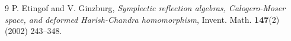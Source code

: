 \documentclass[12pt, a4paper]{amsart}
\begin{document}
\begin{thebibliography}{9}
{\sc P. Etingof and V. Ginzburg},
{\em Symplectic reflection algebras, Calogero-Moser space, and deformed Harish-Chandra homomorphism},
Invent. Math. {\bf 147}(2) (2002) 243--348.%

\end{thebibliography}
\end{document}
